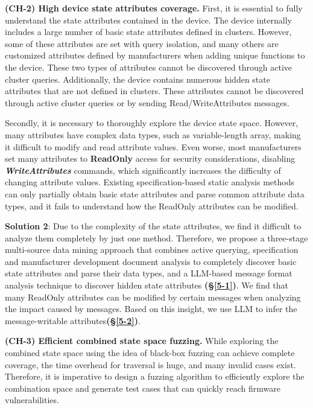 \documentclass[10pt,journal,compsoc]{IEEEtran}
\begin{document}
\noindent \textbf{(CH-2) High device state attributes coverage.} First, it is essential to fully understand the state attributes contained in the device. The device internally includes a large number of basic state attributes defined in clusters. However, some of these attributes are set with query isolation, and many others are customized attributes defined by manufacturers when adding unique functions to the device. These two types of attributes cannot be discovered through active cluster queries. Additionally, the device contains numerous hidden state attributes that are not defined in clusters. These attributes cannot be discovered through active cluster queries or by sending Read/WriteAttributes messages.\vspace{0.1cm}

Secondly, it is necessary to thoroughly explore the device state space. However, many attributes have complex data types, such as variable-length array, making it difficult to modify and read attribute values. Even worse, most manufacturers set many attributes to \textbf{ReadOnly} access for security considerations, disabling \textbf{\textit{WriteAttributes}} commands, which significantly increases the difficulty of changing attribute values. Existing specification-based static analysis methods \cite{ma2023no} can only partially obtain basic state attributes and parse common attribute data types, and it fails to understand how the ReadOnly attributes can be modified.\vspace{0.1cm}

\noindent \checkmark \; \textbf{Solution 2}: Due to the complexity of the state attributes, we find it difficult to analyze them completely by just one method. Therefore, we propose a three-stage multi-source data mining approach that combines active querying, specification and manufacturer development document analysis to completely discover basic state attributes and parse their data types, and a LLM-based message format analysis technique to discover hidden state attributes \textbf{(\S\ref{5-1})}. We find that many ReadOnly attributes can be modified by certain messages when analyzing the impact caused by messages. Based on this insight, we use LLM to infer the message-writable attributes\textbf{(\S\ref{5-2})}. \\ \vspace{-0.2cm}

\noindent \textbf{(CH-3) Efficient combined state space fuzzing.} While exploring the combined state space using the idea of black-box fuzzing \cite{ma2023no} can achieve complete coverage, the time overhead for traversal is huge, and many invalid cases exist. Therefore, it is imperative to design a fuzzing algorithm to efficiently explore the combination space and generate test cases that can quickly reach firmware vulnerabilities.\vspace{0.1cm}
\end{document}
